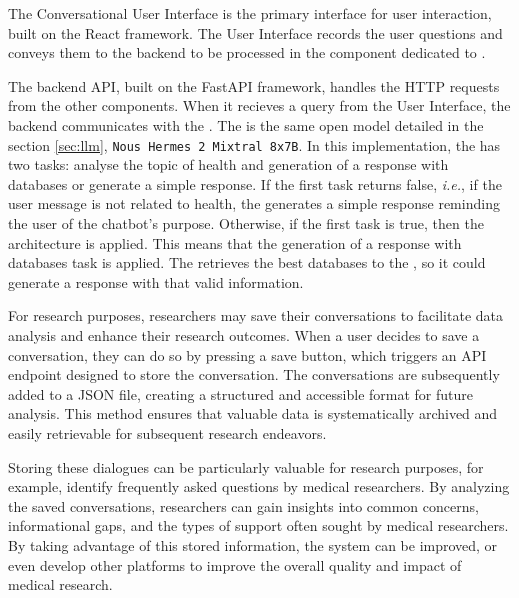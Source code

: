 The Conversational User Interface is the primary interface for user interaction, built on the React framework. The User Interface records the user questions and conveys them to the backend to be processed in the component dedicated to {\ir}. 

The backend API, built on the FastAPI framework, handles the HTTP requests from the other components. When it recieves a query from the User Interface, the backend communicates with the {\llm}. The {\llm} is the same open model detailed in the section \ref{sec:llm}, \texttt{Nous Hermes 2 Mixtral 8x7B}. In this implementation, the {\llm} has two tasks: analyse the topic of health and generation of a response with databases or generate a simple response. If the first task returns false, \textit{i.e.}, if the user message is not related to health, the {\llm} generates a simple response reminding the user of the chatbot's purpose. Otherwise, if the first task is true, then the {\rag} architecture is applied. This means that the generation of a response with databases task is applied. The {\bm} retrieves the best databases to the {\llm}, so it could generate a response with that valid information.

For research purposes, researchers may save their conversations to facilitate data analysis and enhance their research outcomes. When a user decides to save a conversation, they can do so by pressing a save button, which triggers an API endpoint designed to store the conversation. The conversations are subsequently added to a JSON file, creating a structured and accessible format for future analysis. This method ensures that valuable data is systematically archived and easily retrievable for subsequent research endeavors.

Storing these dialogues can be particularly valuable for research purposes, for example, identify frequently asked questions by medical researchers. By analyzing the saved conversations, researchers can gain insights into common concerns, informational gaps, and the types of support often sought by medical researchers. By taking advantage of this stored information, the system can be improved, or even develop other platforms to improve the overall quality and impact of medical research.
